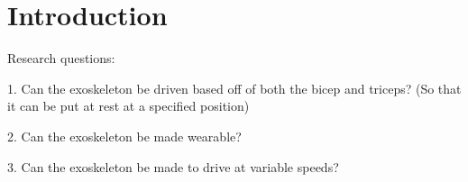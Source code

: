 \section{Introduction}
\label{section:intro}



Research questions:

%
%
%

1.	Can the exoskeleton be driven based off of both the bicep and triceps? (So that it can be put at rest at a specified position)

2.	Can the exoskeleton be made wearable?

3.	Can the exoskeleton be made to drive at variable speeds?

